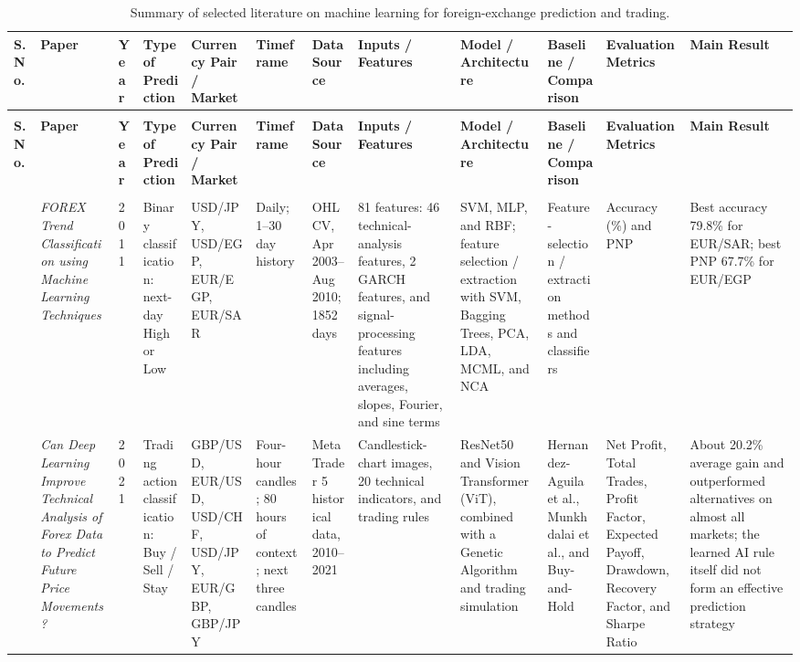\begin{landscape}
\scriptsize
\setlength{\tabcolsep}{3pt}
\renewcommand{\arraystretch}{1.25}
\begin{longtable}{@{}>{\centering\arraybackslash}p{0.45cm}L{1.6cm}L{0.45cm}L{1.75cm}L{1.4cm}L{1.4cm}L{1.6cm}L{2.0cm}L{2.1cm}L{1.6cm}L{1.5cm}L{2.1cm}@{}}
\caption{Summary of selected literature on machine learning for foreign-exchange prediction and trading.}
\label{tab:literature-review}\\
\toprule
\textbf{S.No.} & \textbf{Paper} & \textbf{Year} & \textbf{Type of Prediction} & \textbf{Currency Pair / Market} & \textbf{Timeframe} & \textbf{Data Source} & \textbf{Inputs / Features} & \textbf{Model / Architecture} & \textbf{Baseline / Comparison} & \textbf{Evaluation Metrics} & \textbf{Main Result} \\
\midrule
\endfirsthead
{} \\
\toprule
\textbf{S.No.} & \textbf{Paper} & \textbf{Year} & \textbf{Type of Prediction} & \textbf{Currency Pair / Market} & \textbf{Timeframe} & \textbf{Data Source} & \textbf{Inputs / Features} & \textbf{Model / Architecture} & \textbf{Baseline / Comparison} & \textbf{Evaluation Metrics} & \textbf{Main Result} \\
\midrule
\endhead
\midrule
{} \\
\endfoot
\bottomrule
{} & \textit{FOREX Trend Classification using Machine Learning Techniques} & 2011 & Binary classification: next-day High or Low & USD/JPY, USD/EGP, EUR/EGP, EUR/SAR & Daily; 1--30 day history & OHLCV, Apr 2003--Aug 2010; 1852 days & 81 features: 46 technical-analysis features, 2 GARCH features, and signal-processing features including averages, slopes, Fourier, and sine terms & SVM, MLP, and RBF; feature selection / extraction with SVM, Bagging Trees, PCA, LDA, MCML, and NCA & Feature-selection / extraction methods and classifiers & Accuracy (\%) and PNP & Best accuracy 79.8\% for EUR/SAR; best PNP 67.7\% for EUR/EGP \\
2 & \textit{Can Deep Learning Improve Technical Analysis of Forex Data to Predict Future Price Movements?} & 2021 & Trading action classification: Buy / Sell / Stay & GBP/USD, EUR/USD, USD/CHF, USD/JPY, EUR/GBP, GBP/JPY & Four-hour candles; 80 hours of context; next three candles & MetaTrader 5 historical data, 2010--2021 & Candlestick-chart images, 20 technical indicators, and trading rules & ResNet50 and Vision Transformer (ViT), combined with a Genetic Algorithm and trading simulation & Hernandez-Aguila et al., Munkhdalai et al., and Buy-and-Hold & Net Profit, Total Trades, Profit Factor, Expected Payoff, Drawdown, Recovery Factor, and Sharpe Ratio & About 20.2\% average gain and outperformed alternatives on almost all markets; the learned AI rule itself did not form an effective prediction strategy \\

\end{longtable}
\end{landscape}
